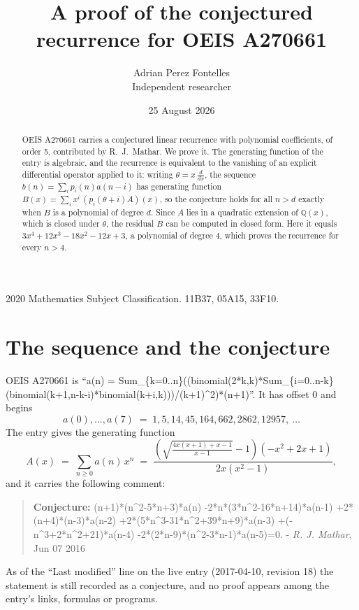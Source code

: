 \documentclass[11pt,a4paper]{article}
\title{A proof of the conjectured recurrence for OEIS A270661}
\author{Adrian Perez Fontelles\\ \small Independent researcher}
\date{25 August 2026}
\theoremstyle{plain}
\theoremstyle{definition}
\begin{document}
\maketitle

\begin{abstract}
OEIS A270661 carries a conjectured linear recurrence with polynomial coefficients, of
order 5, contributed by R.~J.~Mathar. We prove it. The generating function of the
entry is algebraic, and the recurrence is equivalent to the vanishing of an explicit
differential operator applied to it: writing $\theta=x\,\frac{d}{dx}$, the sequence
$b(n)=\sum_{i}p_{i}(n)a(n-i)$ has generating function
$B(x)=\sum_{i}x^{i}\,(p_{i}(\theta+i)A)(x)$, so the conjecture holds for all $n>d$ exactly
when $B$ is a polynomial of degree $d$. Since $A$ lies in a quadratic extension of
$\mathbb{Q}(x)$, which is closed under $\theta$, the residual $B$ can be computed in
closed form. Here it equals $3 x^{4} + 12 x^{3} - 18 x^{2} - 12 x + 3$, a polynomial of degree $4$, which proves
the recurrence for every $n>4$.
\end{abstract}

\noindent\small 2020 Mathematics Subject Classification. 11B37, 05A15, 33F10.\normalsize

\section{The sequence and the conjecture}

OEIS A270661 is ``a(n) = Sum\_\{k=0..n\}((binomial(2*k,k)*Sum\_\{i=0..n-k\}(binomial(k+1,n-k-i)*binomial(k+i,k)))/(k+1)\^{}2)*(n+1)''. It has offset $0$ and begins
\[
a(0),\dots,a(7)\;=\;1, 5, 14, 45, 164, 662, 2862, 12957,\ \dots
\]
The entry gives the generating function
\begin{equation}\label{eq:gf}
A(x)\;=\;\sum_{n\ge 0} a(n)\,x^{n}\;=\;\frac{\left(\sqrt{\frac{4 x \left(x + 1\right) + x - 1}{x - 1}} - 1\right) \left(- x^{2} + 2 x + 1\right)}{2 x \left(x^{2} - 1\right)} ,
\end{equation}
and it carries the following comment:
\begin{quote}\small
\textbf{Conjecture:} (n+1)*(n\^{}2-5*n+3)*a(n) -2*n*(3*n\^{}2-16*n+14)*a(n-1) +2*(n+4)*(n-3)*a(n-2) +2*(5*n\^{}3-31*n\^{}2+39*n+9)*a(n-3) +(-n\^{}3+2*n\^{}2+21)*a(n-4) -2*(2*n-9)*(n\^{}2-3*n-1)*a(n-5)=0. - \emph{R. J. Mathar}, Jun 07 2016
\end{quote}
As of the ``Last modified'' line on the live entry (2017-04-10, revision 18) the
statement is still recorded as a conjecture, and no proof appears among the entry's links,
formulas or programs.
\end{document}
